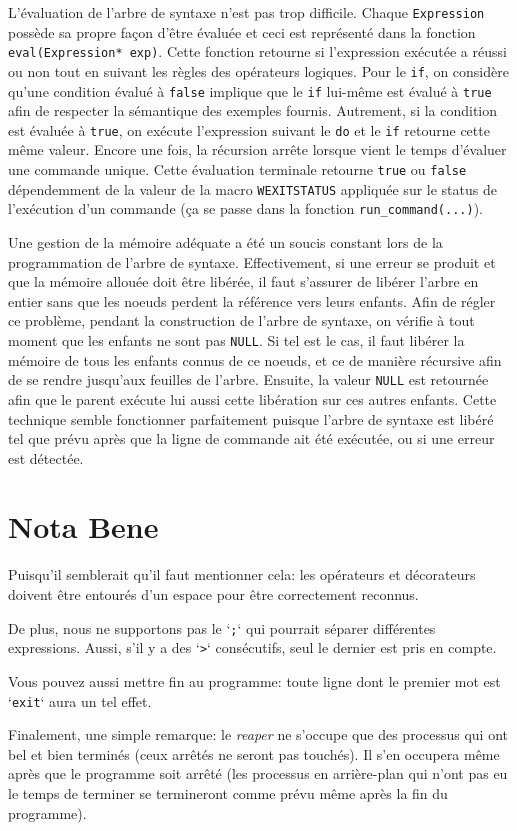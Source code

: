 \documentclass{article}
\begin{document}
L'évaluation de l'arbre de syntaxe n'est pas trop difficile. Chaque \texttt{Expression} possède sa propre façon d'être évaluée et ceci est représenté dans la fonction \texttt{eval(Expression* exp)}. Cette fonction retourne si l'expression exécutée a réussi ou non tout en suivant les règles des opérateurs logiques. Pour le \texttt{if}, on considère qu'une condition évalué à \texttt{false} implique que le \texttt{if} lui-même est évalué à \texttt{true} afin de respecter la sémantique des exemples fournis. Autrement, si la condition est évaluée à \texttt{true}, on exécute l'expression suivant le \texttt{do} et le \texttt{if} retourne cette même valeur. Encore une fois, la récursion arrête lorsque vient le temps d'évaluer une commande unique. Cette évaluation terminale retourne \texttt{true} ou \texttt{false} dépendemment de la valeur de la macro \texttt{WEXITSTATUS} appliquée sur le status de l'exécution d'un commande (ça se passe dans la fonction \texttt{run\_command(...)}).\newline

Une gestion de la mémoire adéquate a été un soucis constant lors de la programmation de l'arbre de syntaxe. Effectivement, si une erreur se produit et que la mémoire allouée doit être libérée, il faut s'assurer de libérer l'arbre en entier sans que les noeuds perdent la référence vers leurs enfants. Afin de régler ce problème, pendant la construction de l'arbre de syntaxe, on vérifie à tout moment que les enfants ne sont pas \texttt{NULL}. Si tel est le cas, il faut libérer la mémoire de tous les enfants connus de ce noeuds, et ce de manière récursive afin de se rendre jusqu'aux feuilles de l'arbre. Ensuite, la valeur \texttt{NULL} est retournée afin que le parent exécute lui aussi cette libération sur ces autres enfants. Cette technique semble fonctionner parfaitement puisque l'arbre de syntaxe est libéré tel que prévu après que la ligne de commande ait été exécutée, ou si une erreur est détectée.\newline

\section{Nota Bene}

Puisqu'il semblerait qu'il faut mentionner cela: les opérateurs et décorateurs doivent être entourés d'un espace pour être correctement reconnus.

De plus, nous ne supportons pas le `\texttt{;}` qui pourrait séparer différentes expressions. Aussi, s'il y a des `\texttt{>}` consécutifs, seul le dernier est pris en compte.

Vous pouvez aussi mettre fin au programme: toute ligne dont le premier mot est `\texttt{exit}` aura un tel effet.

Finalement, une simple remarque: le \textit{reaper} ne s'occupe que des processus qui ont bel et bien terminés (ceux arrêtés ne seront pas touchés). Il s'en occupera même après que le programme soit arrêté (les processus en arrière-plan qui n'ont pas eu le temps de terminer se termineront comme prévu même après la fin du programme).
\end{document}
